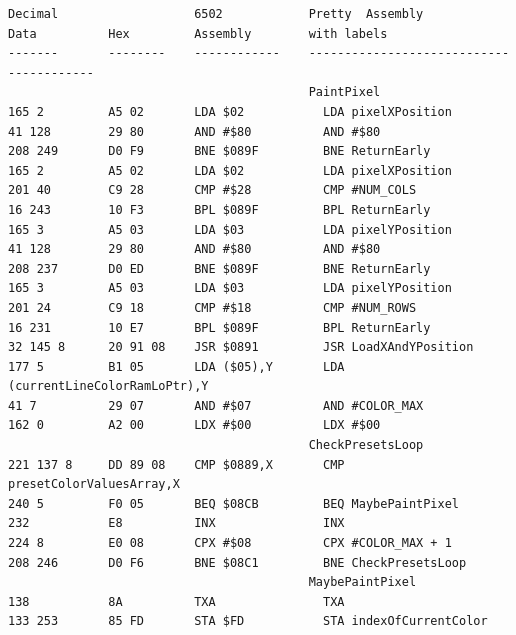 \lstset{style=6502Style}
\begin{lstlisting}[basicstyle=\ttfamily\scriptsize]
Decimal                   6502            Pretty  Assembly
Data          Hex         Assembly        with labels
-------       --------    ------------    ----------------------------------------
                                          PaintPixel                                       
165 2         A5 02       LDA $02           LDA pixelXPosition                               
41 128        29 80       AND #$80          AND #$80
208 249       D0 F9       BNE $089F         BNE ReturnEarly                                  
165 2         A5 02       LDA $02           LDA pixelXPosition                               
201 40        C9 28       CMP #$28          CMP #NUM_COLS                                    
16 243        10 F3       BPL $089F         BPL ReturnEarly                                  
165 3         A5 03       LDA $03           LDA pixelYPosition                               
41 128        29 80       AND #$80          AND #$80
208 237       D0 ED       BNE $089F         BNE ReturnEarly                                  
165 3         A5 03       LDA $03           LDA pixelYPosition                               
201 24        C9 18       CMP #$18          CMP #NUM_ROWS                                    
16 231        10 E7       BPL $089F         BPL ReturnEarly                                  
32 145 8      20 91 08    JSR $0891         JSR LoadXAndYPosition                            
177 5         B1 05       LDA ($05),Y       LDA (currentLineColorRamLoPtr),Y       
41 7          29 07       AND #$07          AND #COLOR_MAX                                   
162 0         A2 00       LDX #$00          LDX #$00                                         
                                          CheckPresetsLoop
221 137 8     DD 89 08    CMP $0889,X       CMP presetColorValuesArray,X             
240 5         F0 05       BEQ $08CB         BEQ MaybePaintPixel                                        
232           E8          INX               INX                                              
224 8         E0 08       CPX #$08          CPX #COLOR_MAX + 1                               
208 246       D0 F6       BNE $08C1         BNE CheckPresetsLoop                                        
                                          MaybePaintPixel   
138           8A          TXA               TXA                                      
133 253       85 FD       STA $FD           STA indexOfCurrentColor                          

\end{lstlisting}
